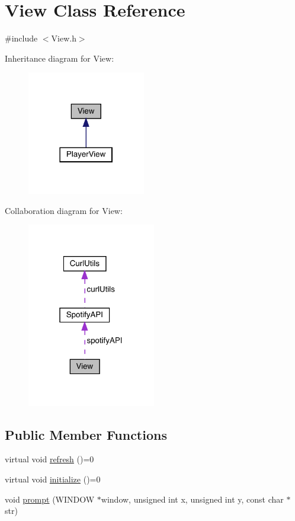 \hypertarget{class_view}{}\section{View Class Reference}
\label{class_view}


{\ttfamily \#include $<$View.\+h$>$}



Inheritance diagram for View\+:
\nopagebreak
\begin{figure}[H]
\begin{center}
\leavevmode
\includegraphics[width=146pt]{class_view__inherit__graph}
\end{center}
\end{figure}


Collaboration diagram for View\+:
\nopagebreak
\begin{figure}[H]
\begin{center}
\leavevmode
\includegraphics[width=159pt]{class_view__coll__graph}
\end{center}
\end{figure}
\subsection*{Public Member Functions}
\begin{DoxyCompactItemize}
\item 
virtual void \mbox{\hyperlink{class_view_a6d911cc903b676dbae7c91daa5277803}{refresh}} ()=0
\item 
virtual void \mbox{\hyperlink{class_view_a267f7ca5c1e77fcbc28fd57c90628b7d}{initialize}} ()=0
\item 
void \mbox{\hyperlink{class_view_a48b5a945ec29e4a9a4c98e6da58b9a45}{prompt}} (W\+I\+N\+D\+OW $\ast$window, unsigned int x, unsigned int y, const char $\ast$str)
\end{DoxyCompactItemize}
